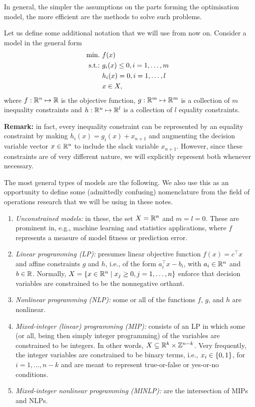 In general, the simpler the assumptions on the parts forming the optimisation model, the more efficient are the methods to solve such problems. 

Let us define some additional notation that we will use from now on. Consider a model in the general form
%
\begin{align*}
	\mathop{\text{min.~}} & f(x) \\
	\mathop{\text{s.t.:~}}   & g_i(x) \leq 0, i = 1, \dots, m \\
	      & h_i(x) = 0, i = 1, \dots, l \\
	      & x \in X,  
\end{align*}
%
where $f: \mathbb{R}^n \mapsto \mathbb{R}$ is the objective function, $g:\mathbb{R}^m \mapsto \mathbb{R}^m$ is a collection of $m$ inequality constraints and $h: \mathbb{R}^n \mapsto \mathbb{R}^l$ is a collection of $l$ equality constraints.

{\bf Remark:} in fact, every inequality constraint can be represented by an equality constraint by making $h_i(x) = g_i(x) + x_{n+1}$ and augmenting the decision variable vector $x \in \mathbb{R}^n$ to include the slack variable $x_{n+1}$. However, since these constraints are of very different nature, we will explicitly represent both whenever necessary.

The most general types of models are the following. We also use this as an opportunity to define some (admittedly confusing) nomenclature from the field of operations research that we will be using in these notes.
%
\begin{enumerate}
    \item \emph{Unconstrained models:} in these, the set $X = \mathbb{R}^n$ and $m=l=0$. These are prominent in, e.g., machine learning and statistics applications, where $f$ represents a measure of model fitness or prediction error.  
    \item \emph{Linear programming (LP):} presumes linear objective function $f(x) = c^\top x$ and affine constraints $g$ and $h$, i.e., of the form $a_i^\top x - b_i$, with $a_i \in \mathbb{R}^n$ and $b \in \mathbb{R}$. Normally, $X = \left\{ x \in \mathbb{R}^n \mid x_j \geq 0, j = 1,\dots, n \right \}$ enforce that decision variables are constrained to be the nonnegative orthant.
    \item \emph{Nonlinear programming (NLP):} some or all of the functions $f$, $g$, and $h$ are nonlinear.
    \item \emph{Mixed-integer (linear) programming (MIP):} consists of an LP in which some (or all, being then simply integer programming) of the variables are constrained to be integers. In other words, $X \subseteq \mathbb{R}^k \times \mathbb{Z}^{n-k}$. Very frequently, the integer variables are constrained to be binary terms, i.e., $x_i \in \left\{ 0,1 \right \}$, for $i = 1,\dots, n-k$ and are meant to represent true-or-false or yes-or-no conditions.
    \item \emph{Mixed-integer nonlinear programming (MINLP):} are the intersection of MIPs and NLPs.  
\end{enumerate}


